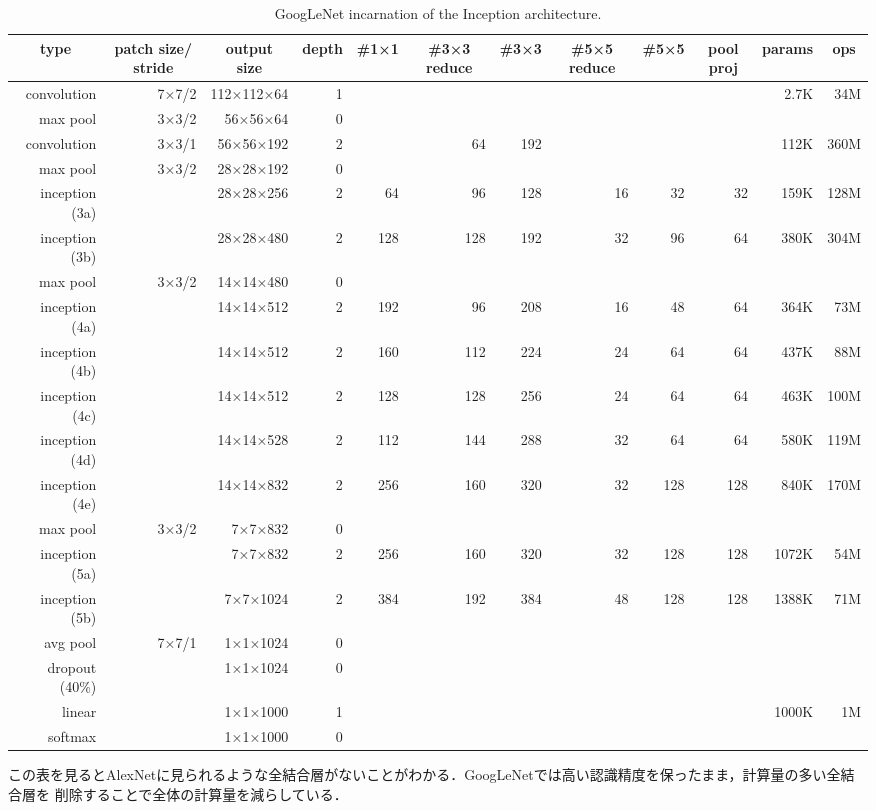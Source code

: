 {\begin{table}[p]
  \begin{center}
  \caption{GoogLeNet incarnation of the Inception architecture.}
  \label{table:googlenet}
  \begin{tabular}{|r|r|r|r|r|r|r|r|r|r|r|r|} \hline
  \multicolumn{1}{|c|}{type} & \multicolumn{1}{|c|}{patch size/ stride} & \multicolumn{1}{|c|}{output size} & \multicolumn{1}{|c|}{depth} & \multicolumn{1}{|c|}{\#1×1} & \multicolumn{1}{|c|}{\#3×3 reduce} & \multicolumn{1}{|c|}{\#3×3} & \multicolumn{1}{|c|}{\#5×5 reduce} & \multicolumn{1}{|c|}{\#5×5} & \multicolumn{1}{|c|}{pool proj} & \multicolumn{1}{|c|}{params} & \multicolumn{1}{|c|}{ops} \\ \hline \hline
  convolution & 7×7/2 & 112×112×64 & 1 &  &  &  &  &  &  & 2.7K & 34M \\ \hline
  max pool & 3×3/2 & 56×56×64 & 0 &  &  &  &  &  &  &  &  \\ \hline
  convolution & 3×3/1 & 56×56×192 & 2 &  & 64 & 192 &  &  &  & 112K & 360M  \\ \hline
  max pool & 3×3/2 & 28×28×192 & 0 &  &  &  &  &  &  &  & \\ \hline
  inception (3a) &  & 28×28×256 & 2 & 64 & 96 & 128 & 16 & 32 & 32 & 159K & 128M \\ \hline
  inception (3b) &  & 28×28×480 & 2 & 128 & 128 & 192 & 32 & 96 & 64 & 380K & 304M \\ \hline
  max pool & 3×3/2 & 14×14×480 & 0 &  &  &  &  &  &  &  &  \\ \hline
  inception (4a) &  & 14×14×512 & 2 & 192 & 96 & 208 & 16 & 48 & 64 & 364K & 73M \\ \hline
  inception (4b) &  & 14×14×512 & 2 & 160 & 112 & 224 & 24 & 64 & 64 & 437K & 88M \\ \hline
  inception (4c) &  & 14×14×512 & 2 & 128 & 128 & 256 & 24 & 64 & 64 & 463K & 100M \\ \hline
  inception (4d) &  & 14×14×528 & 2 & 112 & 144 & 288 & 32 & 64 & 64 & 580K & 119M \\ \hline
  inception (4e) &  & 14×14×832 & 2 & 256 & 160 & 320 & 32 & 128 & 128 & 840K & 170M \\ \hline
  max pool & 3×3/2 & 7×7×832 & 0 &  &  &  &  &  &  &  &  \\ \hline
  inception (5a) &  & 7×7×832 & 2 & 256 & 160 & 320 & 32 & 128 & 128 & 1072K & 54M \\ \hline
  inception (5b) &  & 7×7×1024 & 2 & 384 & 192 & 384 & 48 & 128 & 128 & 1388K & 71M \\ \hline
  avg pool & 7×7/1 & 1×1×1024 & 0 &  &  &  &  &  &  &  &  \\ \hline
  dropout (40\%) &  & 1×1×1024 & 0 &  &  &  &  &  &  &  &  \\ \hline
  linear &  & 1×1×1000 & 1 &  &  &  &  &  &  & 1000K & 1M \\ \hline
  softmax &  & 1×1×1000 & 0 &  &  &  &  &  &  &  &  \\ \hline
  \end{tabular}
  \end{center}
  \end{table}
  

この表を見るとAlexNetに見られるような全結合層がないことがわかる．GoogLeNetでは高い認識精度を保ったまま，計算量の多い全結合層を
削除することで全体の計算量を減らしている．
}